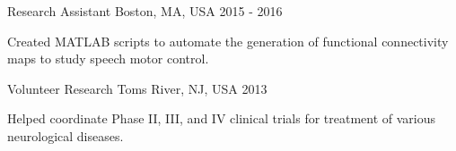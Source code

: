 \begin{cventries}
    \vspace*{0.2cm}

    {Research Assistant}
    {Boston, MA, USA}
    {2015 - 2016}
    {\begin{cvitems}
        \item Created MATLAB scripts to automate the generation of functional connectivity maps to study speech motor control.
    \end{cvitems}\vspace{1.5\baselineskip}}

    \vspace*{0.2cm}
    
    {Volunteer Research}
    {Toms River, NJ, USA}
    {2013}
    {\begin{cvitems}
        \item Helped coordinate Phase II, III, and IV clinical trials for treatment of various neurological diseases.
    \end{cvitems}\vspace{1.5\baselineskip}}

\end{cventries}

\vspace*{-0.35cm}
